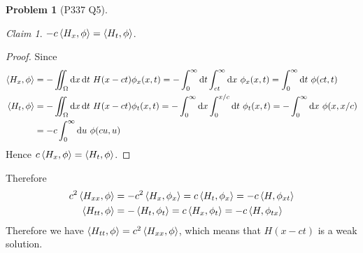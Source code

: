 \documentclass[twoside,11pt]{article}
\renewcommand*\d{\mathop{}\!\mathrm{d}}
\theoremstyle{definition}
\newtheorem{problem}{Problem}
\theoremstyle{remark}
\newtheorem*{claim}{Claim}
\begin{document}
\begin{problem}[P337 Q5]
\begin{claim}
$-c\braket{H_x, \phi} = \braket{H_t,\phi}$.
\end{claim}
\begin{proof}
Since
\begin{align*}
    \braket{H_x,\phi} &= 
    -\iint_\Omega \d x\d t\ 
    H(x-ct)\phi_x(x, t)
    = -\int_0^\infty\d t\int_{ct}^\infty\d x\ \phi_x(x, t)
    = \int_0^\infty\d t\ \phi(ct, t)\\
    \braket{H_t,\phi} &= 
    -\iint_\Omega\d x \d t\
    H(x-ct)\phi_t(x, t)
    = -\int_0^\infty\d x\int_0^{x/c}\d t\
    \phi_t(x, t)
    = -\int_0^\infty\d x\ \phi(x, x/c)\\
    &= -c\int_0^\infty\d u\ \phi(cu, u)
\end{align*}
Hence $c\braket{H_x, \phi} = \braket{H_t,\phi}$.
\end{proof}
Therefore
\begin{align*}
    c^2\braket{H_{xx}, \phi} &= 
    -c^2\braket{H_x, \phi_x}
    = c\braket{H_t, \phi_x}
    = -c\braket{H, \phi_{xt}}\\
    \braket{H_{tt}, \phi} &= 
    -\braket{H_t, \phi_t}
    = c\braket{H_x, \phi_t}
    = -c\braket{H, \phi_{tx}}
\end{align*}
Therefore we have $\braket{H_{tt},\phi}=c^2\braket{H_{xx}, \phi}$,
which means that $H(x-ct)$ is a weak solution.

\end{problem}




\end{document}
